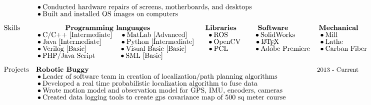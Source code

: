 \documentclass[]{article}
\newcommand{\subpoint}[1]{\bullet \text{\fontsize{10pt}{12pt}\selectfont #1}}
\newcommand{\Date}[1]{ \text{\fontsize{9pt}{12pt}\selectfont #1}}
\begin{document}
\begin{align*}
& && \subpoint{Conducted hardware repairs of screens, motherboards, and desktops}\\[-.5em]
& && \subpoint{Built and installed OS images on computers}\\[.5em]
%
%
%
&\text{Skills} && \textbf{ \hspace{1.2cm} Programming languages \hspace{2.5cm} Libraries \hspace{.8cm} Software} && \hspace{-2.0 cm}\textbf{Mechanical} \\[-.5em]
& && \subpoint{C/C++ [Intermediate]} \hspace{.4cm} \subpoint{MatLab [Advanced]} \hspace{1cm} \subpoint{ROS} \hspace{1.3cm} \subpoint{SolidWorks} && \hspace{-2.0 cm} \subpoint{Mill}\\[-.5em]
& && \subpoint{Java [Intermediate]}
 \hspace{.925cm}  \subpoint{Python [Intermediate]} \hspace{.655cm} \subpoint{OpenCV}
 \hspace{.7 cm} \subpoint{\LaTeX}
 && \hspace{-2cm} \subpoint{Lathe}\\[-.5em]
& && \subpoint{Verilog [Basic]} \hspace{1.65cm} \subpoint{Visual Basic [Basic]} 
\hspace{1.05cm} \subpoint{PCL}
\hspace{1.3cm} \subpoint{Adobe Premiere}
&&\hspace{-2cm} \subpoint{Carbon Fiber}\\[-.5em]
& && \subpoint{PHP/Java Script}  \hspace{1.2cm} \subpoint{SML [Basic]}
\hspace{1.5cm} \\[.5em]
%
%
%
& \text{Projects} && \textbf{Robotic Buggy} & \Date{2013 - Current}\\[-.5em]
& && \subpoint{Leader of software team in creation of localization/path planning algorithms}\\[-.5em]
& && \subpoint{Developed a real time probabilistic localization algorithm to fuse data}\\[-.5em]
& && \subpoint{Wrote motion model and observation model for GPS, IMU, encoders, cameras}\\[-.5em]
& && \subpoint{Created data logging tools to create gps covariance map of 500 sq meter course}\\[-.5em]

\end{align*}
\end{document}
